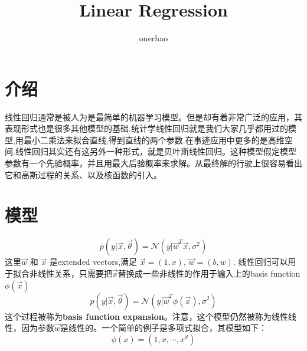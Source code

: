 \documentclass[a4paper]{article}
\title{Linear Regression}
\author{onerhao}
\begin{document}
	

\maketitle

\begin{abstract}

\end{abstract}

\section{介绍}
线性回归通常是被人为是最简单的机器学习模型。但是却有着非常广泛的应用，其表现形式也是很多其他模型的基础.统计学线性回归就是我们大家几乎都用过的模型,用最小二乘法来拟合直线,得到直线的两个参数.在事迹应用中更多的是高维空间.线性回归其实还有这另外一种形式，就是贝叶斯线性回归。这种模型假定模型参数有一个先验概率，并且用最大后验概率来求解。从最终解的行驶上很容易看出它和高斯过程的关系、以及核函数的引入。


\section{模型}

\begin{equation}
p(y|\vec{x},\vec{\theta})=\mathcal{N}(y|\vec{w}^T\vec{x}, \sigma^2)
\end{equation}
这里$\vec{w}$ 和 $\vec{x}$ 是extended vectors,满足 $\vec{x}=(1,x)$, $\vec{w}=(b,w)$.
线性回归可以用于拟合非线性关系，只需要把$\vec{x}$替换成一些非线性的作用于输入上的basis function $\phi(\vec{x})$ \begin{equation}
p(y|\vec{x},\vec{\theta})=\mathcal{N}(y|\vec{w}^T\phi(\vec{x}), \sigma^2)
\end{equation}
这个过程被称为\textbf{basis function expansion}。注意，这个模型仍然被称为线性线性，因为参数$\vec{w}$是线性的。一个简单的例子是多项式拟合，其模型如下：
\begin{equation}
\phi(x)=(1, x, \cdots, x^d)
\end{equation}
\end{document}
